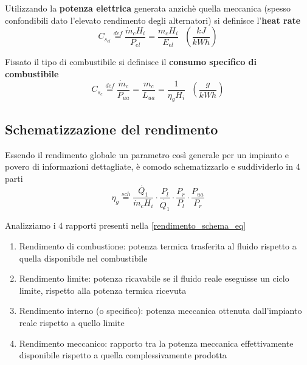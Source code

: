 \documentclass[a4paper,10pt]{article}
\begin{document}
Utilizzando la \textbf{potenza elettrica} generata anzichè quella meccanica
(spesso confondibili dato l'elevato rendimento degli alternatori) si definisce
l'\textbf{heat rate}
\begin{equation}
 C_{s_{el}} \stackrel{def}{=} \frac{\dot{m}_c H_i}{P_{el}} = \frac{m_c H_i}{E_{el}} \ \ \ \left(\frac{kJ}{kWh} \right)
\end{equation}

Fissato il tipo di combustibile si definisce il \textbf{consumo specifico di combustibile}
\begin{equation}
C_{s_c} \stackrel{def}{=} \frac{\dot{m}_c}{P_{ua}} = \frac{m_c}{L_{ua}} = \frac{1}{\eta_gH_i} \ \ \ \left(\frac{g}{kWh} \right)
\end{equation}
\subsection*{Schematizzazione del rendimento}
\label{sec:rendimento_schema}
Essendo il rendimento globale un parametro così generale per un impianto e povero
di informazioni dettagliate, è comodo schematizzarlo e suddividerlo in 4 parti
\begin{equation}
\label{rendimento_schema_eq}
 \eta_g \stackrel{sch}{=} \frac{\dot{Q_1}}{\dot{m}_c H_i}\cdot \frac{P_l}{\dot{Q_1}}\cdot \frac{P_r}{P_l}\cdot \frac{P_{ua}}{P_r}
\end{equation}

Analizziamo i 4 rapporti presenti nella \eqref{rendimento_schema_eq}
\begin{enumerate}
\item Rendimento di combustione: potenza termica trasferita al fluido rispetto
a quella disponibile nel combustibile

\item Rendimento limite:
potenza ricavabile se il fluido reale eseguisse un ciclo limite, rispetto alla potenza
termica ricevuta

\item Rendimento interno (o specifico): potenza meccanica ottenuta dall'impianto reale 
rispetto a quello limite

\item Rendimento meccanico: rapporto tra la potenza meccanica effettivamente 
disponibile rispetto a quella complessivamente prodotta
\end{enumerate}
\end{document}

